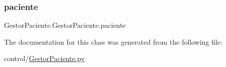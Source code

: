 \subsubsection{\texorpdfstring{paciente}{paciente}}
{\footnotesize\ttfamily Gestor\+Paciente.\+Gestor\+Paciente.\+paciente}



The documentation for this class was generated from the following file\+:\begin{DoxyCompactItemize}
\item 
control/\mbox{\hyperlink{_gestor_paciente_8py}{Gestor\+Paciente.\+py}}\end{DoxyCompactItemize}
